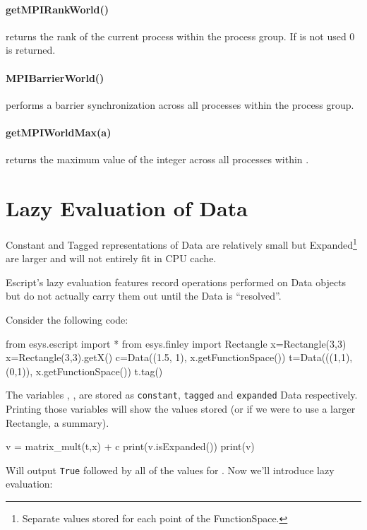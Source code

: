 \paragraph{getMPIRankWorld()}
returns the rank of the current process within the 
process group. If \MPI is not used 0 is returned.


\paragraph{MPIBarrierWorld()}
performs a barrier synchronization across all processes within the
 process group.


\paragraph{getMPIWorldMax(a)}
returns the maximum value of the integer  across all processes within
.


\section{Lazy Evaluation of Data}
\label{sec:lazy}
Constant and Tagged representations of Data are relatively small but Expanded\footnote{Separate values stored for each point of the FunctionSpace.} are larger and
will not entirely fit in CPU cache.

Escript's lazy evaluation features record operations performed on Data objects but do not actually carry them out until the Data is ``resolved''.

Consider the following code:
\begin{python}
from esys.escript import *
from esys.finley import Rectangle
x=Rectangle(3,3)
x=Rectangle(3,3).getX()
c=Data((1.5, 1), x.getFunctionSpace())
t=Data(((1,1),(0,1)), x.getFunctionSpace())
t.tag()
\end{python}

The variables , ,  are stored as \texttt{constant}, \texttt{tagged} and \texttt{expanded} Data respectively.
Printing those variables will show the values stored (or if we were to use a larger Rectangle, a summary).

\begin{python}
v = matrix_mult(t,x) + c
print(v.isExpanded())
print(v)
\end{python}

Will output \texttt{True} followed by all of the values for .
Now we'll introduce lazy evaluation:

